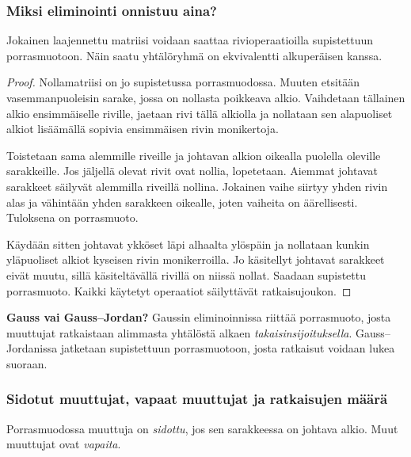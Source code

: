 \documentclass[11pt,a4paper]{amsart}
\begin{document}
  \subsubsection*{Miksi eliminointi onnistuu aina?}

  \begin{theorem}
    Jokainen laajennettu matriisi voidaan saattaa rivioperaatioilla
    supistettuun porrasmuotoon. Näin saatu yhtälöryhmä on ekvivalentti
    alkuperäisen kanssa.
  \end{theorem}
  \begin{proof}
    Nollamatriisi on jo supistetussa porrasmuodossa. Muuten
    etsitään vasemmanpuoleisin sarake, jossa on nollasta poikkeava
    alkio. Vaihdetaan tällainen alkio ensimmäiselle riville,
    jaetaan rivi tällä alkiolla ja nollataan sen alapuoliset alkiot
    lisäämällä sopivia ensimmäisen rivin monikertoja.

    Toistetaan sama alemmille riveille ja johtavan alkion oikealla
    puolella oleville sarakkeille. Jos jäljellä olevat rivit ovat
    nollia, lopetetaan. Aiemmat johtavat sarakkeet säilyvät alemmilla
    riveillä nollina. Jokainen vaihe siirtyy yhden rivin alas ja
    vähintään yhden sarakkeen oikealle, joten vaiheita on äärellisesti.
    Tuloksena on porrasmuoto.

    Käydään sitten johtavat ykköset läpi alhaalta ylöspäin ja
    nollataan kunkin yläpuoliset alkiot kyseisen rivin monikerroilla.
    Jo käsitellyt johtavat sarakkeet eivät muutu, sillä käsiteltävällä
    rivillä on niissä nollat. Saadaan supistettu porrasmuoto.
    Kaikki käytetyt operaatiot säilyttävät ratkaisujoukon.
  \end{proof}

  \noindent\textbf{Gauss vai Gauss--Jordan?}
  Gaussin eliminoinnissa riittää porrasmuoto, josta muuttujat ratkaistaan
  alimmasta yhtälöstä alkaen \emph{takaisinsijoituksella}.
  Gauss--Jordanissa jatketaan supistettuun porrasmuotoon, josta ratkaisut
  voidaan lukea suoraan.

  \subsubsection*{Sidotut muuttujat, vapaat muuttujat ja ratkaisujen määrä}

  \begin{definition}
    Porrasmuodossa muuttuja on \emph{sidottu}, jos sen sarakkeessa
    on johtava alkio. Muut muuttujat ovat \emph{vapaita}.
  \end{definition}
\end{document}
